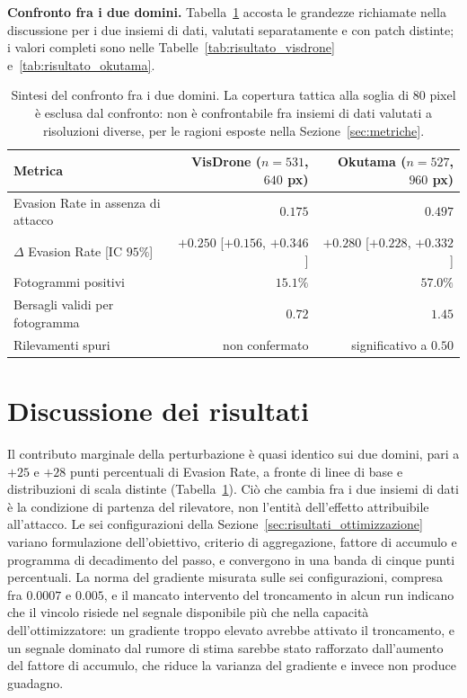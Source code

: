 \ifstampa\documentclass[a4paper,12pt,twoside,openright]{report}\else\documentclass[a4paper,12pt]{report}\fi
\newif\ifrevisione \revisionefalse
\DeclareRobustCommand{\rev}[1]{\ifrevisione{\color{blue!65!black}#1}\else#1\fi}
\begin{document}
\textbf{Confronto fra i due domini.}
\label{sec:confronto_complessivo}
Tabella~\ref{tab:confronto_complessivo} accosta \rev{le grandezze richiamate nella discussione per} i due insiemi di dati, valutati separatamente e con patch distinte\rev{; i valori completi sono nelle Tabelle~\ref{tab:risultato_visdrone} e~\ref{tab:risultato_okutama}}.

\begin{table}[t]
\centering
\footnotesize
\setlength{\tabcolsep}{4pt}
\begin{tabular}{lrr}
\toprule
Metrica & VisDrone ($n = 531$, $640$ px) & Okutama ($n = 527$, $960$ px) \\
\midrule
Evasion Rate in assenza di attacco & $0.175$ & $0.497$ \\
$\Delta$ Evasion Rate [IC $95\%$] & $+0.250$ [$+0.156$, $+0.346$] & $+0.280$ [$+0.228$, $+0.332$] \\
Fotogrammi positivi & $15.1\%$ & $57.0\%$ \\
Bersagli validi per fotogramma & $0.72$ & $1.45$ \\
Rilevamenti spuri & \rev{non confermato} & significativo a $0.50$ \\
\bottomrule
\end{tabular}
\caption{\rev{Sintesi del} confronto fra i due domini. La copertura tattica alla soglia di $80$ pixel è esclusa dal confronto: non è confrontabile fra insiemi di dati valutati a risoluzioni diverse, per le ragioni esposte nella Sezione~\ref{sec:metriche}.}
\label{tab:confronto_complessivo}
\end{table}

\section{Discussione dei risultati}
\label{sec:discussione}

Il contributo marginale della perturbazione è quasi identico sui due domini, pari a $+25$ e $+28$ punti percentuali di Evasion Rate, a fronte di linee di base e distribuzioni di scala distinte (Tabella~\ref{tab:confronto_complessivo}). Ciò che cambia fra i due insiemi di dati è la condizione di partenza del rilevatore, non l'entità dell'effetto attribuibile all'attacco. Le sei configurazioni della Sezione~\ref{sec:risultati_ottimizzazione} variano formulazione \rev{dell'obiettivo}, criterio di aggregazione, fattore di accumulo e programma di decadimento del passo, e convergono in una banda di cinque punti percentuali. La norma del gradiente misurata sulle sei configurazioni, compresa fra $0.0007$ e $0.005$, e il mancato intervento del troncamento in alcun run \rev{indicano che il vincolo risiede nel segnale disponibile più che nella capacità dell'ottimizzatore: un gradiente troppo elevato avrebbe attivato il troncamento, e un segnale dominato dal rumore di stima sarebbe stato rafforzato dall'aumento del fattore di accumulo, che riduce la varianza del gradiente e invece non produce guadagno}.
\end{document}
